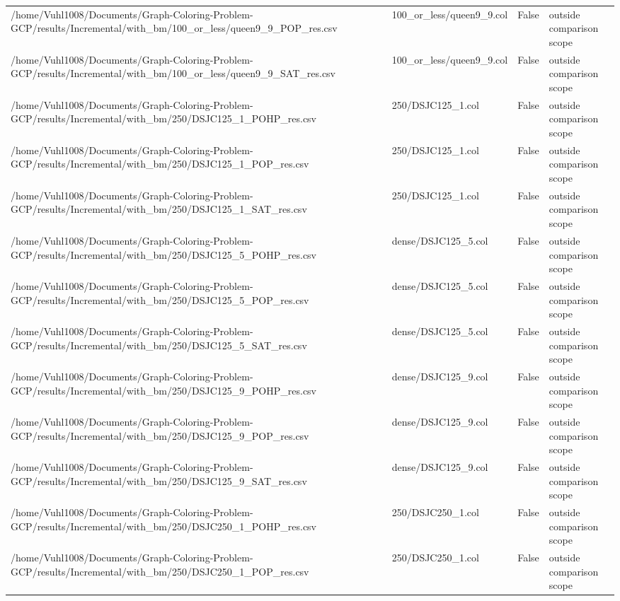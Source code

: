 \begin{table}[htbp]
\begin{tabular}{llll}
/home/Vuhl1008/Documents/Graph-Coloring-Problem-GCP/results/Incremental/with\_bm/100\_or\_less/queen9\_9\_POP\_res.csv & 100\_or\_less/queen9\_9.col & False & outside comparison scope \\
/home/Vuhl1008/Documents/Graph-Coloring-Problem-GCP/results/Incremental/with\_bm/100\_or\_less/queen9\_9\_SAT\_res.csv & 100\_or\_less/queen9\_9.col & False & outside comparison scope \\
/home/Vuhl1008/Documents/Graph-Coloring-Problem-GCP/results/Incremental/with\_bm/250/DSJC125\_1\_POHP\_res.csv & 250/DSJC125\_1.col & False & outside comparison scope \\
/home/Vuhl1008/Documents/Graph-Coloring-Problem-GCP/results/Incremental/with\_bm/250/DSJC125\_1\_POP\_res.csv & 250/DSJC125\_1.col & False & outside comparison scope \\
/home/Vuhl1008/Documents/Graph-Coloring-Problem-GCP/results/Incremental/with\_bm/250/DSJC125\_1\_SAT\_res.csv & 250/DSJC125\_1.col & False & outside comparison scope \\
/home/Vuhl1008/Documents/Graph-Coloring-Problem-GCP/results/Incremental/with\_bm/250/DSJC125\_5\_POHP\_res.csv & dense/DSJC125\_5.col & False & outside comparison scope \\
/home/Vuhl1008/Documents/Graph-Coloring-Problem-GCP/results/Incremental/with\_bm/250/DSJC125\_5\_POP\_res.csv & dense/DSJC125\_5.col & False & outside comparison scope \\
/home/Vuhl1008/Documents/Graph-Coloring-Problem-GCP/results/Incremental/with\_bm/250/DSJC125\_5\_SAT\_res.csv & dense/DSJC125\_5.col & False & outside comparison scope \\
/home/Vuhl1008/Documents/Graph-Coloring-Problem-GCP/results/Incremental/with\_bm/250/DSJC125\_9\_POHP\_res.csv & dense/DSJC125\_9.col & False & outside comparison scope \\
/home/Vuhl1008/Documents/Graph-Coloring-Problem-GCP/results/Incremental/with\_bm/250/DSJC125\_9\_POP\_res.csv & dense/DSJC125\_9.col & False & outside comparison scope \\
/home/Vuhl1008/Documents/Graph-Coloring-Problem-GCP/results/Incremental/with\_bm/250/DSJC125\_9\_SAT\_res.csv & dense/DSJC125\_9.col & False & outside comparison scope \\
/home/Vuhl1008/Documents/Graph-Coloring-Problem-GCP/results/Incremental/with\_bm/250/DSJC250\_1\_POHP\_res.csv & 250/DSJC250\_1.col & False & outside comparison scope \\
/home/Vuhl1008/Documents/Graph-Coloring-Problem-GCP/results/Incremental/with\_bm/250/DSJC250\_1\_POP\_res.csv & 250/DSJC250\_1.col & False & outside comparison scope \\

\end{tabular}
\end{table}
